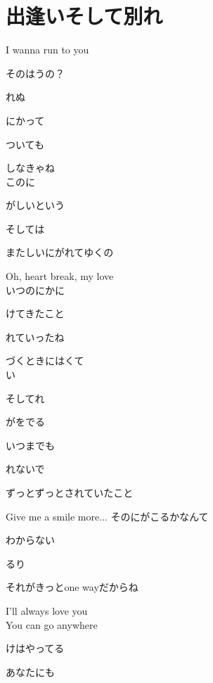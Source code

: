 \section{ 出逢いそして別れ}
\large{

I wanna run to you

そのはうの？

れぬ

にかって

ついても

しなきゃね
\\

このに

がしいという

そしては

またしいにがれてゆくの

Oh, heart break, my love
\\

いつのにかに

けてきたこと

れていったね

づくときにはくて
\\

い

そしてれ

がをでる

いつまでも

れないで

ずっとずっとされていたこと

Give me a smile more... そのにがこるかなんて

わからない

るり

それがきっとone wayだからね

I'll always love you
\\

You can go anywhere

けはやってる

あなたにも

}
